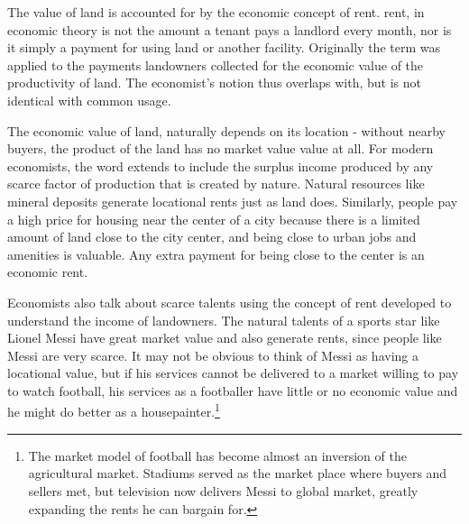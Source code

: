 The value of land is accounted for by the economic concept of rent. \Gls{rent}, in economic theory is not the amount a tenant pays a landlord every month, nor is it simply a payment for using land or another facility. Originally the term was applied to the payments landowners collected for the economic value of the productivity of land. The economist's notion thus overlaps with, but is not identical with common usage. 

The economic value of land, naturally depends on its location - without  nearby buyers, the product of the land has no market value value at all. 
For modern economists, the word extends to include the \gls{surplus} income produced by any scarce factor of production that is created by nature. %
Natural resources like mineral deposits generate locational rents just as  land does. Similarly, people pay a high price for housing near the center of a city because there is a limited amount of
land close to the city center, and being close to urban jobs and amenities is valuable. Any extra payment for being close to the center is an \gls{economic rent}. %

Economists also talk about scarce talents using the concept of rent developed to understand the income of landowners.  The natural talents of a sports star like Lionel Messi have great market value and  also generate rents, since people like Messi are very scarce. %
It may not be obvious  to think of Messi as having a locational value, but if his services cannot be delivered to a market willing to pay to watch football, his services as a footballer have little or no economic value and he might do better as a housepainter.\footnote{The market model of football has become almost an inversion of the agricultural market. Stadiums served as the market place where buyers and sellers met, but television now delivers Messi to global market, greatly expanding the rents he can bargain for.} 

